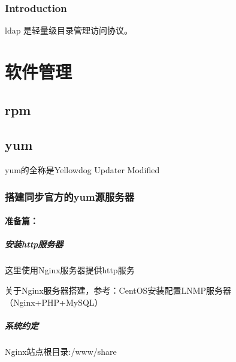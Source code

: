 \documentclass[letterpaper,10pt,english]{sphinxmanual}
\begin{document}
\subsection{Introduction}
\label{\detokenize{user_management/ldap:introduction}}
ldap 是轻量级目录管理访问协议。


\chapter{软件管理}
\label{\detokenize{software_manage/readme:id1}}\label{\detokenize{software_manage/readme::doc}}

\section{rpm}
\label{\detokenize{software_manage/rpm:rpm}}\label{\detokenize{software_manage/rpm::doc}}

\section{yum}
\label{\detokenize{software_manage/yum/readme:yum}}\label{\detokenize{software_manage/yum/readme::doc}}
yum的全称是Yellowdog Updater Modified


\subsection{搭建同步官方的yum源服务器}
\label{\detokenize{software_manage/yum/yum_official_sync:yum}}\label{\detokenize{software_manage/yum/yum_official_sync::doc}}

\subsubsection{准备篇：}
\label{\detokenize{software_manage/yum/yum_official_sync:id1}}

\paragraph{安装http服务器}
\label{\detokenize{software_manage/yum/yum_official_sync:http}}
这里使用Nginx服务器提供http服务

关于Nginx服务器搭建，参考：CentOS安装配置LNMP服务器（Nginx+PHP+MySQL）



\paragraph{系统约定}
\label{\detokenize{software_manage/yum/yum_official_sync:id2}}
Nginx站点根目录:/www/share
\end{document}
